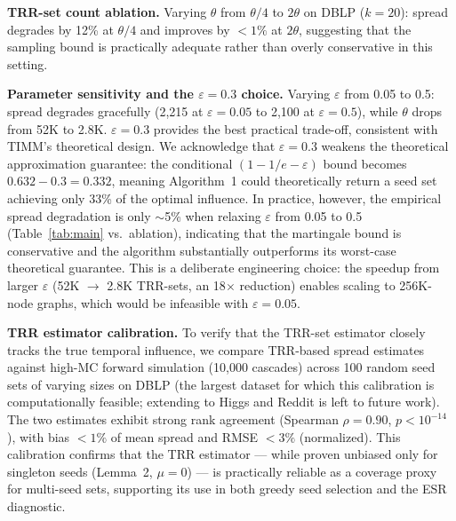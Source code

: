 \documentclass[10pt,conference]{IEEEtran}
\begin{document}
\textbf{TRR-set count ablation.}
Varying $\theta$ from $\theta/4$ to $2\theta$ on DBLP ($k=20$): spread degrades by 12\% at $\theta/4$ and improves by $<1\%$ at $2\theta$, suggesting that the sampling bound is practically adequate rather than overly conservative in this setting.

\textbf{Parameter sensitivity and the $\varepsilon=0.3$ choice.}
Varying $\varepsilon$ from 0.05 to 0.5: spread degrades gracefully (2,215 at $\varepsilon=0.05$ to 2,100 at $\varepsilon=0.5$), while $\theta$ drops from 52K to 2.8K.
$\varepsilon=0.3$ provides the best practical trade-off, consistent with TIMM's theoretical design.
We acknowledge that $\varepsilon=0.3$ weakens the theoretical approximation guarantee: the conditional $(1-1/e-\varepsilon)$ bound becomes $0.632-0.3=0.332$, meaning Algorithm~1 could theoretically return a seed set achieving only 33\% of the optimal influence.
In practice, however, the empirical spread degradation is only $\sim$5\% when relaxing $\varepsilon$ from 0.05 to 0.5 (Table~\ref{tab:main} vs.\ ablation), indicating that the martingale bound is conservative and the algorithm substantially outperforms its worst-case theoretical guarantee.
This is a deliberate engineering choice: the speedup from larger $\varepsilon$ (52K $\to$ 2.8K TRR-sets, an 18$\times$ reduction) enables scaling to 256K-node graphs, which would be infeasible with $\varepsilon=0.05$.

\textbf{TRR estimator calibration.}
To verify that the TRR-set estimator closely tracks the true temporal influence, we compare TRR-based spread estimates against high-MC forward simulation (10,000 cascades) across 100 random seed sets of varying sizes on DBLP (the largest dataset for which this calibration is computationally feasible; extending to Higgs and Reddit is left to future work).
The two estimates exhibit strong rank agreement (Spearman $\rho = 0.90$, $p < 10^{-14}$), with bias $<1\%$ of mean spread and RMSE $<3\%$ (normalized).
This calibration confirms that the TRR estimator — while proven unbiased only for singleton seeds (Lemma~2, $\mu{=}0$) — is practically reliable as a coverage proxy for multi-seed sets, supporting its use in both greedy seed selection and the ESR diagnostic.
\end{document}
